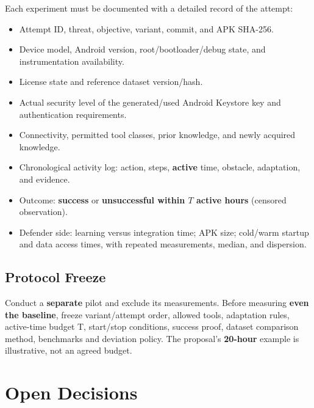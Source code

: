 \documentclass{article}
\newcounter{threat}
\begin{document}
Each experiment must be documented with a detailed record of the attempt:
\begin{itemize}[
    label=\textcolor{KouciGreen600}{\textbullet},
    itemsep=6pt,
    leftmargin=*
]
    \setlength{\itemsep}{6pt}

    \item Attempt ID, threat, objective, variant, commit, and APK SHA-256.

    \item Device model, Android version, root/bootloader/debug state,
    and instrumentation availability.

    \item License state and reference dataset version/hash.

    \item Actual security level of the generated/used Android Keystore
    key and authentication requirements.

    \item Connectivity, permitted tool classes, prior knowledge,
    and newly acquired knowledge.

    \item Chronological activity log: action, steps,
    \textbf{active} time, obstacle, adaptation, and evidence.

    \item Outcome: \textbf{success} or
    \textbf{unsuccessful within $T$ active hours}
    (censored observation).

    \item Defender side: learning versus integration time;
    APK size; cold/warm startup and data access times,
    with repeated measurements, median, and dispersion.
\end{itemize}

\subsection{Protocol Freeze}

Conduct a \textbf{separate} pilot and exclude its measurements. Before measuring \textbf{even the baseline}, freeze variant/attempt order, allowed tools, adaptation rules, active-time budget T, start/stop conditions, success proof, dataset comparison method, benchmarks and deviation policy. The proposal's \textbf{20-hour} example is illustrative, not an agreed budget.

\section{Open Decisions}
\end{document}
